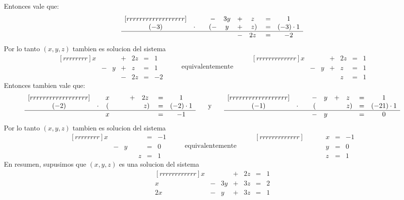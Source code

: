 \documentclass{article}
\theoremstyle{definition}
\theoremstyle{definition}
\theoremstyle{remark}
\begin{document}
Entonces vale que: \[
  \begin{matrix}[rrrrrrrrrrrrrrrrrr]
&&  & - & 3y & + & z\phantom{)} & = & 1 \\
    (-3) & \cdot & & (-& y& + & z ) & = & (-3) \cdot 1 \\
    \hline 
         & & &  &  & - & 2z\phantom{)} & = & -2
  \end{matrix}
\]
Por lo tanto $(x,y,z)$ tambien es solucion del sistema
\[
  \begin{matrix}[rrrrrrrr]
    x & & & + & 2z & = & 1 \\
      & - & y & + & z & = & 1 \\
      &  &  & - & 2z & = & -2
    \end{matrix} \quad \quad \text{ equivalentemente } \quad \quad \begin{matrix}[rrrrrrrrrrrrr]
    x & & & + & 2z & = & 1 \\
      & - & y & + & z & = & 1 \\
      &  &  &  & z & = & 1
  \end{matrix}
\]
Entonces tambien vale que: \[
  \begin{matrix}[rrrrrrrrrrrrrrrrrr]
&& x &  &  & + & 2z\phantom{)} & = & 1 \\
    (-2) & \cdot & (& & &  & z ) & = & (-2) \cdot 1 \\
    \hline 
         & & x &  &  &  & \phantom{)} & = & -1
  \end{matrix} \quad \quad \text{ y } \quad \quad
 \begin{matrix}[rrrrrrrrrrrrrrrrrr]
&&  & - & y & + & z\phantom{)} & = & 1 \\
    (-1) & \cdot & & (& &  & z ) & = & (-21) \cdot 1 \\
    \hline 
         & &  & - & y &  & \phantom{)} & = & 0
  \end{matrix}
\]
Por lo tanto $(x,y,z)$ tambien es solucion del sistema
\[
  \begin{matrix}[rrrrrrrr]
    x & & &  &  & = & -1 \\
      & - & y &  &  & = & 0 \\
      &  &  &  & z & = & 1
    \end{matrix} \quad \quad \text{ equivalentemente } \quad \quad \begin{matrix}[rrrrrrrrrrrrr]
      & & &  &   x & = & -1 \\
      &  & &  & y & = & 0 \\
      &  &  &  & z & = & 1
  \end{matrix}
\]
En resumen, supusimos que $(x,y,z)$ es una solucion del sistema \[
 \begin{matrix}[rrrrrrrrrrrr]
    x & & & + & 2z & = & 1 \\
    x  & - & 3y & + & 3z & = & 2 \\
    2x & - & y & + & 3z & = & 1
  \end{matrix}
\]
\end{document}
